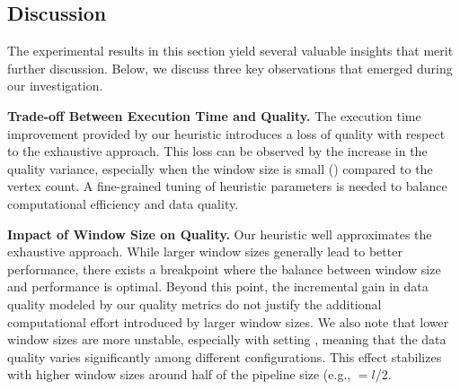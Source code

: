 {\color{OurColor}
\subsection{Discussion}
The experimental results in this section yield several valuable insights that merit further discussion. Below, we discuss three key observations that emerged during our investigation.

\vspace{0.5em}

    \noindent\textbf{Trade-off Between Execution Time and Quality.} The execution time improvement provided by our heuristic introduces a loss of quality with respect to the exhaustive approach. This loss can be observed by the increase in the quality variance, especially when the window size is small (\windowsize) compared to the vertex count. A fine-grained tuning of heuristic parameters is needed to balance computational efficiency and data quality.

\vspace{0.5em}

    \noindent\textbf{Impact of Window Size on Quality.} Our heuristic well approximates the exhaustive approach. While larger window sizes generally lead to better performance, there exists a breakpoint where the balance between window size and performance is optimal. Beyond this point, the incremental gain in data quality modeled by our quality metrics do not justify the additional computational effort introduced by larger window sizes. We also note that lower window sizes are more unstable, especially with setting \wide, meaning that the data quality varies significantly among different configurations. This effect stabilizes with higher window sizes around half of the pipeline size (e.g., \windowsize$=$$l$/2.

}
